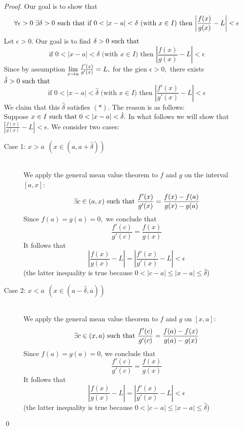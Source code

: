 \begin{proof}
    Our goal is to show that 
    $$
    \forall \epsilon > 0 ~\exists \delta > 0 \text{ such that } \text{if $0 < |x-a| < \delta $ (with $x \in I$) then $\left|\frac{f(x)}{g(x)} - L\right| < \epsilon$}
    $$
    Let $\epsilon > 0.$ Our goal is to find $\delta > 0 \text{ such that }$
    \begin{equation*}
        \text{if $0 < |x-a| < \delta $ (with $x \in I$) then $\left|\frac{f(x)}{g(x)} - L\right| < \epsilon$}
        \tag{$*$}
    \end{equation*}
    Since by assumption $\lim \limits_{x \to a} \frac{f'(x)}{g'(x)} = L,$ for the gien $\epsilon > 0,$ there exists $\hat{\delta} > 0 \text{ such that }$
    $$
        \text{if $0 < |x-a| < \hat{\delta} $ (with $x \in I$) then $\left|\frac{f'(x)}{g'(x)} - L\right| < \epsilon$}
    $$
    We claim that this $\hat{\delta}$ satisfies $(*)$. The reason is as follows: \leavevmode\\
    Suppose $x\in I \text{ such that } 0 < |x-a| < \hat{\delta}.$ In what follows we will show that $\left|\frac{f(x)}{g(x)} - L\right| < \epsilon$. We consider two cases:

    \begin{description}
        \item[Case 1: $x > a ~~\left(x \in (a, a + \hat{\delta})\right)$] \leavevmode\\
        We apply the general mean value theorem to $f$ and $g$ on the interval $[a,x]$:
        $$
        \exists c \in (a,x) \text{ such that } \frac{f'(x)}{g'(x)} = \frac{f(x) - f(a)}{g(x) - g(a)}
        $$
        Since $f(a) = g(a) = 0,$ we conclude that 
        $$
        \frac{f'(c)}{g'(c)} = \frac{f(x)}{g(x)}
        $$
        It follows that 
        $$
        \left|\frac{f(x)}{g(x)} - L\right| = \left|\frac{f'(x)}{g'(x)} - L\right| < \epsilon
        $$
        (the latter inequality is true because $0 < |c-a| \leq |x-a| \leq \hat{\delta}$)
        \item[Case 2: $x < a ~~\left(x \in (a - \hat{\delta}, a)\right)$] \leavevmode\\
        We apply the general mean value theorem to $f$ and $g$ on $[x,a]:$
        $$
        \exists c \in (x, a) \text{ such that } \frac{f'(c)}{g'(c)} = \frac{f(a) - f(x)}{g(a) - g(x)}
        $$
        Since $f(a)=g(a)=0$, we conclude that 
        $$
        \frac{f'(c)}{g'(c)} = \frac{f(x)}{g(x)}
        $$
        It follows that 
        $$
        \left|\frac{f(x)}{g(x)} - L\right| = \left|\frac{f'(x)}{g'(x)} - L\right| < \epsilon
        $$
        (the latter inequality is true because $0 < |c-a| \leq |x-a| \leq \hat{\delta}$)
    \end{description}
    \qed
\end{proof}